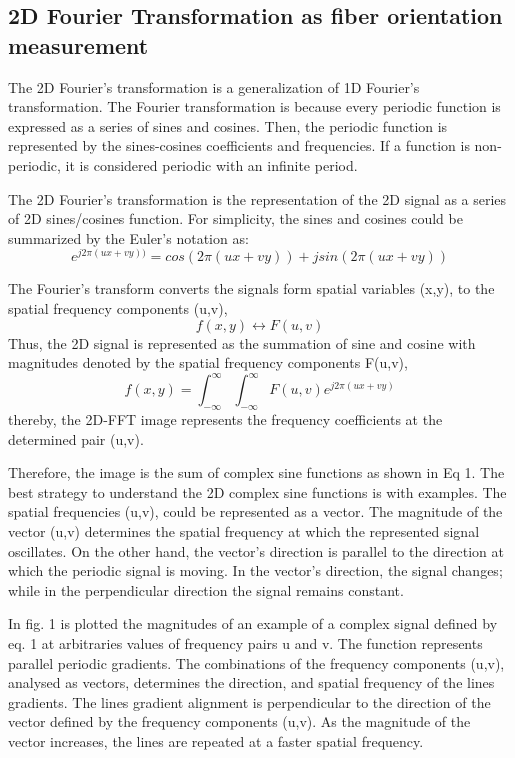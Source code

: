 \documentclass[12pt,a4paper]{article}
\begin{document}
\subsection{2D Fourier Transformation as fiber orientation measurement}
The 2D Fourier's transformation is a generalization of 1D Fourier's transformation. The Fourier transformation is because every periodic function is expressed as a series of sines and cosines. Then, the periodic function is represented by the sines-cosines coefficients and frequencies. If a function is non-periodic, it is considered periodic with an infinite period.

The 2D Fourier's transformation is the representation of the 2D signal as a series of 2D sines/cosines function. For simplicity, the sines and cosines could be summarized by the Euler’s notation as:
\begin{equation}
e^{j2\pi(ux+vy))}=cos(2\pi(ux+vy))+jsin(2\pi(ux+vy))
\end{equation}

The Fourier’s transform converts the signals form spatial variables (x,y), to the spatial frequency components (u,v),
\begin{equation}
f(x,y)\leftrightarrow F(u,v)
\end{equation}
Thus, the 2D signal is represented as the summation of sine and cosine with magnitudes denoted by the spatial frequency components F(u,v),  
\begin{equation}
f(x,y)=\int_{-\infty}^{\infty}\int_{-\infty}^{\infty}F(u,v)e^{j2\pi(ux+vy)}
\end{equation}
thereby, the 2D-FFT image represents the frequency  coefficients at the determined pair (u,v). 

Therefore, the image is the sum of complex sine functions as shown in Eq 1. The best strategy to understand the 2D complex sine functions is with examples. The spatial frequencies (u,v), could be represented as a vector. The magnitude of the vector (u,v) determines the spatial frequency at which the represented signal oscillates. On the other hand, the vector's direction is parallel to the direction at which the periodic signal is moving. In the vector's direction, the signal changes; while in the perpendicular direction the signal remains constant. 

In fig. 1 is plotted the magnitudes of an example of a complex signal defined by eq. 1 at arbitraries values of frequency pairs u and v. The function represents parallel periodic gradients. The combinations of the frequency components (u,v), analysed as vectors, determines the direction, and spatial frequency of the lines gradients. The lines gradient alignment is perpendicular to the direction of the vector defined by the frequency components (u,v). As the magnitude of the vector increases, the lines are repeated at a faster spatial frequency. 
\end{document}
